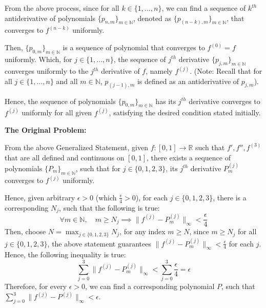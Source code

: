 \documentclass{article}
\begin{document}
\hfill

From the above process, since for all $k\in \{1,...,n\}$, we can find a sequence of $k^{th}$ antiderivative of polynomials $\{p_{n,m}\}_{m\in\mathbb{N}}$, denoted as $\{p_{(n-k),m}\}_{m\in\mathbb{N}}$, that converges to $f^{(n-k)}$ uniformly. 

Then, $\{p_{0,m}\}_{m\in\mathbb{N}}$ is a sequence of polynomial that converges to $f^{(0)}=f$ uniformly. Which, for $j\in\{1,...,n\}$, the sequence of $j^{th}$ derivative $\{p_{j,m}\}_{m\in\mathbb{N}}$ converges uniformly to the $j^{th}$ derivative of $f$, namely $f^{(j)}$.
(Note: Recall that for all $j\in\{1,...,n\}$ and all $m\in\mathbb{N}$, $p_{(j-1),m}$ is defined as an antiderivative of $p_{j,m}$).

Hence, the sequence of polynomials $\{p_{0,m}\}_{m\in\mathbb{N}}$ has its $j^{th}$ derivative converges to $f^{(j)}$ uniformly for all given $f^{(j)}$, satisfying the desired condition stated initially.

\hfill

\textbf{The Original Problem:}

From the above Generalized Statement, given $f:[0,1]\rightarrow\mathbb{R}$ such that $f',f'',f^{(3)}$ that are all defined and continuous on $[0,1]$, there exists a sequence of polynomials $\{P_m\}_{m\in\mathbb{N}}$, 
such that for $j\in\{0,1,2,3\}$, its $j^{th}$ derivative $P_m^{(j)}$ converges to $f^{(j)}$ uniformly.

Hence, given arbitrary $\epsilon>0$ (which $\frac{\epsilon}{4}>0$), for each $j\in\{0,1,2,3\}$, there is a corresponding $N_j$, such that the following is true:
$$\forall m\in\mathbb{N},\quad m\geq N_j \implies \|f^{(j)}-P_m^{(j)}\|_\infty <\frac{\epsilon}{4}$$
Then, choose $N = \max_{j\in\{0,1,2,3\}}N_j$, for any index $m\geq N$, since $m\geq N_j$ for all $j\in\{0,1,2,3\}$, the above statement guarantees $\|f^{(j)}-P_m^{(j)}\|_\infty <\frac{\epsilon}{4}$ for each $j$.
Hence, the following inequality is true:
$$\sum_{j=0}^{3}\|f^{(j)}-P_m^{(j)}\|_\infty < \sum_{j=0}^{3}\frac{\epsilon}{4}=\epsilon$$
Therefore, for every $\epsilon>0$, we can find a corresponding polynomial $P$, such that $\sum_{j=0}^{3}\|f^{(j)}-P^{(j)}\|_\infty<\epsilon$.
\end{document}
